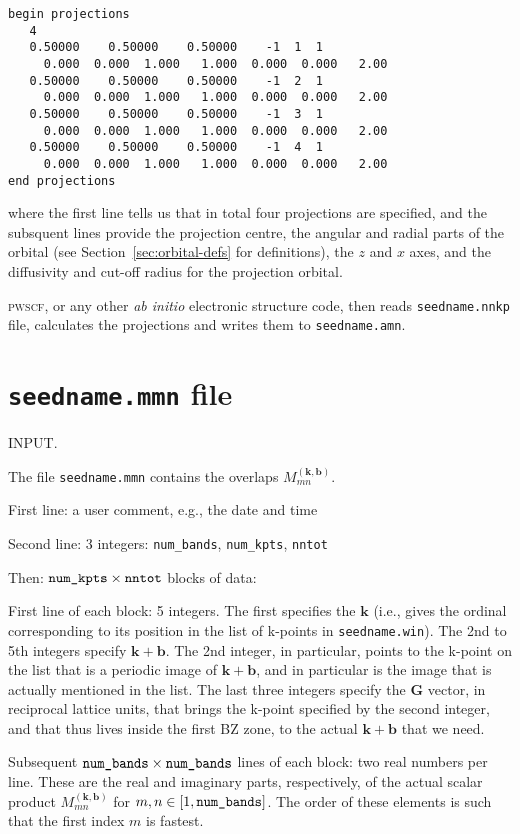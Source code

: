 \begin{verbatim}
begin projections
   4
   0.50000    0.50000    0.50000    -1  1  1
     0.000  0.000  1.000   1.000  0.000  0.000   2.00 
   0.50000    0.50000    0.50000    -1  2  1
     0.000  0.000  1.000   1.000  0.000  0.000   2.00 
   0.50000    0.50000    0.50000    -1  3  1
     0.000  0.000  1.000   1.000  0.000  0.000   2.00 
   0.50000    0.50000    0.50000    -1  4  1
     0.000  0.000  1.000   1.000  0.000  0.000   2.00 
end projections
\end{verbatim}

where the first line tells us that in total four projections are
specified, and the subsquent lines provide the projection centre, the
angular and radial parts of the orbital (see
Section~\ref{sec:orbital-defs} for definitions), the $z$ and $x$ axes,
and the diffusivity and cut-off radius for the projection orbital.

\textsc{pwscf}, or any other \textit{ab initio} electronic structure
code, then reads \verb#seedname.nnkp# file, calculates the projections
and writes them to \verb#seedname.amn#. 


\section{{\tt seedname.mmn} file} 

INPUT. 

The file \verb#seedname.mmn# contains the overlaps
$M_{mn}^{(\mathbf{k,b})}$.

First line: a user comment, e.g., the date and time

Second line: 3 integers: \verb#num_bands#, \verb#num_kpts#,
\verb#nntot#

Then: $\verb#num_kpts#\times\verb#nntot#$ blocks of data:
 
First line of each block: 5 integers. The first specifies the
$\mathbf{k}$ (i.e., gives the ordinal corresponding to its position in
the list  of k-points in \verb#seedname.win#). The 2nd to 5th integers
specify $\mathbf{k+b}$. The  2nd integer, in particular, points to the
k-point on the list that is a  periodic image of $\mathbf{k+b}$, and
in particular is the image that is actually mentioned in the list. The 
last three integers specify the $\mathbf{G}$ vector, in  reciprocal
lattice units, that brings the k-point specified by the second
integer, and that thus lives inside the first BZ zone, to the actual
$\mathbf{k+b}$ that we need.

Subsequent $\verb#num_bands#\times\verb#num_bands#$ lines of each
block: two real numbers per line. These are the real and imaginary
parts, respectively, of the actual scalar product
$M_{mn}^{(\mathbf{k,b})}$ for $m,n \in [1,\verb#num_bands#]$. The
order of these elements is such that the first index $m$ is fastest.


